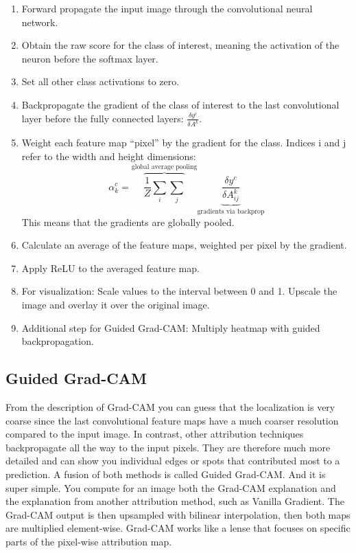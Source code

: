 \documentclass[
  12pt,
]{krantz}
\providecommand{\tightlist}{%
  \setlength{\itemsep}{0pt}\setlength{\parskip}{0pt}}
\begin{document}
\begin{enumerate}
\def\labelenumi{\arabic{enumi}.}
\tightlist
\item
  Forward propagate the input image through the convolutional neural network.
\item
  Obtain the raw score for the class of interest, meaning the activation of the neuron before the softmax layer.
\item
  Set all other class activations to zero.
\item
  Backpropagate the gradient of the class of interest to the last convolutional layer before the fully connected layers: \(\frac{\delta{}y^c}{\delta{}A^k}\).
\item
  Weight each feature map ``pixel'' by the gradient for the class. Indices i and j refer to the width and height dimensions:
  \[\alpha_k^c = \overbrace{\frac{1}{Z}\sum_{i}\sum_{j}}^{\text{global average pooling}} \underbrace{\frac{\delta y^c}{\delta A_{ij}^k}}_{\text{gradients via backprop}}\]
  This means that the gradients are globally pooled.
\item
  Calculate an average of the feature maps, weighted per pixel by the gradient.
\item
  Apply ReLU to the averaged feature map.
\item
  For visualization: Scale values to the interval between 0 and 1. Upscale the image and overlay it over the original image.
\item
  Additional step for Guided Grad-CAM: Multiply heatmap with guided backpropagation.
\end{enumerate}

\hypertarget{guided-grad-cam}{%
\subsection{Guided Grad-CAM}\label{guided-grad-cam}}

From the description of Grad-CAM you can guess that the localization is very coarse since the last convolutional feature maps have a much coarser resolution compared to the input image.
In contrast, other attribution techniques backpropagate all the way to the input pixels.
They are therefore much more detailed and can show you individual edges or spots that contributed most to a prediction.
A fusion of both methods is called Guided Grad-CAM.
And it is super simple.
You compute for an image both the Grad-CAM explanation and the explanation from another attribution method, such as Vanilla Gradient.
The Grad-CAM output is then upsampled with bilinear interpolation, then both maps are multiplied element-wise.
Grad-CAM works like a lense that focuses on specific parts of the pixel-wise attribution map.
\end{document}
